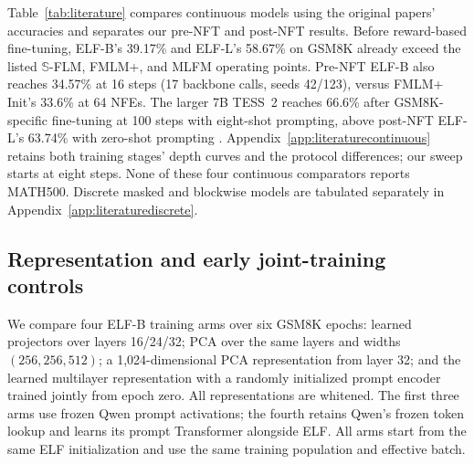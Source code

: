 
Table~\ref{tab:literature} compares continuous models using the original papers' accuracies and separates our pre-NFT and post-NFT results. Before reward-based fine-tuning, ELF-B's 39.17\% and ELF-L's 58.67\% on GSM8K already exceed the listed $\mathbb S$-FLM, FMLM+, and MLFM operating points. Pre-NFT ELF-B also reaches 34.57\% at 16 steps (17 backbone calls, seeds 42/123), versus FMLM+ Init's 33.6\% at 64 NFEs. The larger 7B TESS~2 reaches 66.6\% after GSM8K-specific fine-tuning at 100 steps with eight-shot prompting, above post-NFT ELF-L's 63.74\% with zero-shot prompting \citep{tess2}. Appendix~\ref{app:literaturecontinuous} retains both training stages' depth curves and the protocol differences; our sweep starts at eight steps. None of these four continuous comparators reports MATH500. Discrete masked and blockwise models are tabulated separately in Appendix~\ref{app:literaturediscrete}.

\subsection{Representation and early joint-training controls}
\label{sec:representationcontrols}
We compare four ELF-B training arms over six GSM8K epochs: learned projectors over layers 16/24/32; PCA over the same layers and widths $(256,256,512)$; a 1,024-dimensional PCA representation from layer 32; and the learned multilayer representation with a randomly initialized prompt encoder trained jointly from epoch zero. All representations are whitened. The first three arms use frozen Qwen prompt activations; the fourth retains Qwen's frozen token lookup and learns its prompt Transformer alongside ELF. All arms start from the same ELF initialization and use the same training population and effective batch.

